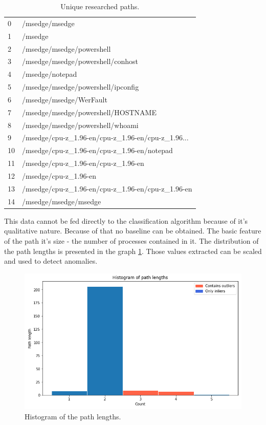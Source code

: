 \documentclass[a4paper,twoside,12pt]{book}
\begin{document}
\begin{table}
	\centering
	\caption{Unique researched paths.}
	\label{id:tab:uniqPaths}
	\begin{tabular}{ll}
		\toprule
		0  &                                     /msedge/msedge \\
		1  &                                            /msedge \\
		2  &                          /msedge/msedge/powershell \\
		3  &                  /msedge/msedge/powershell/conhost \\
		4  &                                    /msedge/notepad \\
		5  &                 /msedge/msedge/powershell/ipconfig \\
		6  &                            /msedge/msedge/WerFault \\
		7  &                 /msedge/msedge/powershell/HOSTNAME \\
		8  &                   /msedge/msedge/powershell/whoami \\
		9  &  /msedge/cpu-z\_1.96-en/cpu-z\_1.96-en/cpu-z\_1.96... \\
		10 &        /msedge/cpu-z\_1.96-en/cpu-z\_1.96-en/notepad \\
		11 &                /msedge/cpu-z\_1.96-en/cpu-z\_1.96-en \\
		12 &                              /msedge/cpu-z\_1.96-en \\
		13 &  /msedge/cpu-z\_1.96-en/cpu-z\_1.96-en/cpu-z\_1.96-en \\
		14 &                              /msedge/msedge/msedge \\
		\bottomrule
	\end{tabular}
\end{table}

This data cannot be fed directly to the classification algorithm because of it's 
qualitative nature. Because of that no baseline can be obtained. The basic feature
of the path it's size - the number of processes contained in it. The distribution
of the path lengths is presented in the graph \ref{fig:pathLenHist}. Those values
extracted can be scaled and used to detect anomalies.

\begin{figure}
	\centering
	\includegraphics[scale=0.9]{images/pathLenHist}
	\caption{Histogram of the path lengths.}
	\label{fig:pathLenHist}
 \end{figure}
\end{document}
